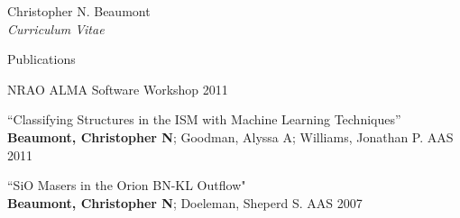 \documentclass[10pt]{article}
\newenvironment{sublist}{%
	\begin{list}{}{%
		\setlength{\itemsep}{0em}\setlength{\parsep}{0em}%
		\setlength{\topsep}{0em}\setlength{\parskip}{0em}%
	}%
}%
{ \end{list} }
\begin{document}
\begin{cv}{Christopher N. Beaumont\\{\large \itshape Curriculum Vitae}}
\begin{cvlist}{Publications}
\begin{sublist}
	NRAO ALMA Software Workshop 2011 \\
	\item ``Classifying Structures in the ISM with Machine Learning Techniques'' \\
	\textbf{Beaumont, Christopher N}; Goodman, Alyssa A; Williams, Jonathan P. AAS 2011 \\
	\item ``SiO Masers in the Orion BN-KL Outflow"\\
	\textbf{Beaumont, Christopher N}; Doeleman, Sheperd S. AAS 2007
	\end{sublist} 
\end{cvlist}
\setlength{\cvlabelwidth}{\oldcvlabelwidth}

\setlength{\oldcvlabelwidth}{\cvlabelwidth}
\setlength{\cvlabelwidth}{1em}
\setlength{\cvlabelwidth}{\oldcvlabelwidth}

\setlength{\oldcvlabelwidth}{\cvlabelwidth}
\setlength{\cvlabelwidth}{1em}
\begin{comment}
\begin{cvlist}{Technical Skills}
	\item \textbf{Proficient}
	\begin{sublist}
		\item Python, IDL 
	\end{sublist}
	\item \textbf{Familiar} 
	\begin{sublist}
		\item Mathematica, C, Java, Python, PHP, Perl
	\end{sublist}
\end{cvlist}
\setlength{\cvlabelwidth}{\oldcvlabelwidth}
\end{comment}

\end{cv}
\end{document}
